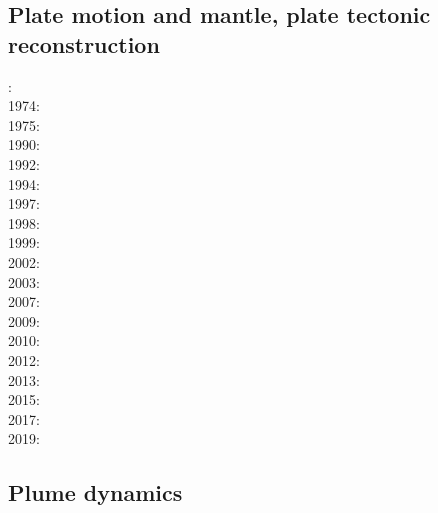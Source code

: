 \subsection{Plate motion and mantle, plate tectonic reconstruction}

{\scriptsize
{}: \cite{mcse73}\\
1974: \cite{sosl74}\\
1975: \cite{harp75}\\
1990: \cite{dega90}\\
1992: \cite{zieg92a}\\
1994: \cite{guto94}\\
1997: \cite{wean97b}\\
1998: \cite{zhgm98}\\
1999: \cite{ribr99}\\
2002: \cite{stoc02}\\
2003: \cite{evan03}\cite{reta03}\\
2007: \cite{zhzl07}\\
2009: \cite{lizh09}\cite{vasv09}\cite{iabu09}\cite{scbs09}\\
2010: \cite{stto10}\cite{dega10}\\
2012: \cite{huss12}\cite{gutz12}\cite{qumm12}\cite{holr12}\cite{dost12}\cite{shbs12}\\
2013: \cite{mosq13}\cite{cost13}\\
2015: \cite{yoha15}\\
2017: \cite{stid17}\\
2019: \cite{tewg19}\cite{weco19}
}

\subsection{Plume dynamics}

